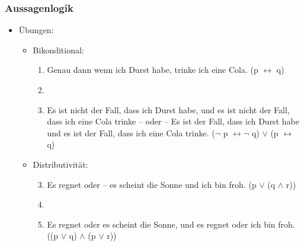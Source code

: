 \begin{frame}
\frametitle{Aussagenlogik}

\begin{itemize}
	\item Übungen: 
	
\vspace{1em}

	\begin{itemize}
		\item Bikonditional:
	
		\begin{enumerate}
			\item Genau dann wenn ich Durst habe, trinke ich eine Cola. (p $\leftrightarrow$ q)
			\item[]
			\item Es ist nicht der Fall, dass ich Durst habe, und es ist nicht der Fall, dass ich eine Cola trinke – oder – Es ist der Fall, dass ich Durst habe und es ist der Fall, dass ich eine Cola trinke. ($\lnot$ p $\leftrightarrow \lnot$ q) $\lor$ (p $\leftrightarrow$ q)
		\end{enumerate}
	
		\item Distributivität:
	
		\begin{enumerate}\setcounter{enumi}{2}
			\item Es regnet oder -- es scheint die Sonne und ich bin froh. (p  $\lor$ (q $\land$ r))
			\item[]
			\item Es regnet oder es scheint die Sonne, und es regnet oder ich bin froh. ((p $\lor$ q) $\land$ (p $\lor$ r))
		\end{enumerate}

	\end{itemize}

\end{itemize}



\end{frame}



